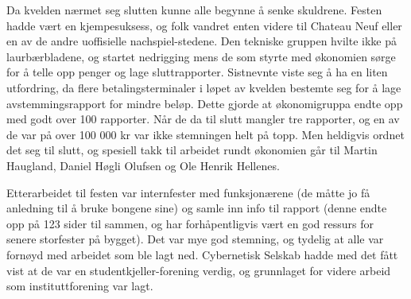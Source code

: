 Da kvelden nærmet seg slutten kunne alle begynne å senke skuldrene. Festen hadde vært en kjempesuksess, og folk vandret enten videre til Chateau Neuf eller en av de andre uoffisielle nachspiel-stedene. Den tekniske gruppen hvilte ikke på laurbærbladene, og startet nedrigging mens de som styrte med økonomien sørge for å telle opp penger og lage sluttrapporter. Sistnevnte viste seg å ha en liten utfordring, da flere betalingsterminaler i løpet av kvelden bestemte seg for å lage avstemmingsrapport for mindre beløp. Dette gjorde at økonomigruppa endte opp med godt over 100 rapporter. Når de da til slutt mangler tre rapporter, og en av de var på over 100 000 kr var ikke stemningen helt på topp. Men heldigvis ordnet det seg til slutt, og spesiell takk til arbeidet rundt økonomien går til Martin Haugland, Daniel Høgli Olufsen og Ole Henrik Hellenes.

Etterarbeidet til festen var internfester med funksjonærene (de måtte jo få anledning til å bruke bongene sine) og samle inn info til rapport (denne endte opp på 123 sider til sammen, og har forhåpentligvis vært en god ressurs for senere storfester på bygget). Det var mye god stemning, og tydelig at alle var fornøyd med arbeidet som ble lagt ned. Cybernetisk Selskab hadde med det fått vist at de var en studentkjeller-forening verdig, og grunnlaget for videre arbeid som instituttforening var lagt.
